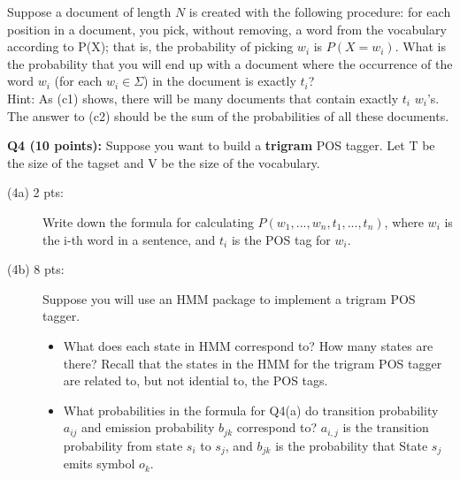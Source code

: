 \documentclass[11pt]{article}
\begin{document}
\begin{description}
\begin{description}
      Suppose a document of length $N$ is created with 
        the following procedure: for each position in a document,
        you pick, without removing, a word from the vocabulary
        according to P(X);
        that is, the probability of picking $w_i$ is $P(X=w_i)$. 
        What is the probability that you will end up with a document where
         the occurrence of the word $w_i$ (for each $w_i \in \Sigma$)
         in the document is exactly $t_i$? \\

         Hint: As (c1) shows, there will be many 
         documents that contain exactly $t_i$ $w_i$'s. The answer to (c2) should
         be the sum of the probabilities of all these documents.
      \end{description}
 
  \end{description}

\vspace{0.3 in}
\hspace{-0.3in}
{\bf Q4 (10 points):} Suppose you want to build a {\bf trigram} POS tagger.
      Let T be the size of the tagset and V be the size of the vocabulary.
  \begin{description}
   \item [(4a) 2 pts:] Write down the formula for calculating 
               $P(w_1, ..., w_n, t_1, ..., t_n)$, 
               where $w_i$ is the i-th word in a sentence,
               and $t_i$ is the POS tag for $w_i$.

   \item [(4b) 8 pts:] Suppose you will use an HMM package to implement
               a trigram POS tagger.
        \begin{itemize}
        \item What does each state in HMM correspond to?
          How many states are there? Recall that the states in
          the HMM for the trigram POS tagger are related to, but not
          idential to, the POS tags.

         \item What probabilities in the formula for Q4(a) do 
                transition probability $a_{ij}$
                and emission probability $b_{jk}$ correspond to? 
                $a_{i,j}$ is the transition probability from state 
                $s_i$ to $s_j$, and $b_{jk}$ is the probability that 
                State $s_j$ emits symbol $o_k$.


        \end{itemize}

   \end{description}
\end{document}

